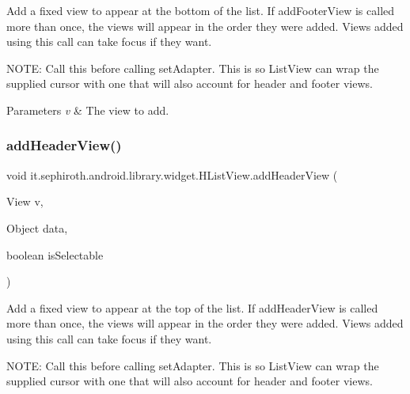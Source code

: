 Add a fixed view to appear at the bottom of the list. If add\+Footer\+View is called more than once, the views will appear in the order they were added. Views added using this call can take focus if they want. 

N\+O\+TE\+: Call this before calling set\+Adapter. This is so List\+View can wrap the supplied cursor with one that will also account for header and footer views.


\begin{DoxyParams}{Parameters}
{\em v} & The view to add. \\
\hline
\end{DoxyParams}
\mbox{\label{classit_1_1sephiroth_1_1android_1_1library_1_1widget_1_1_h_list_view_aecc0066eda50ae16e9a48114dc71eb3e}} 
\subsubsection{\texorpdfstring{add\+Header\+View()}{addHeaderView()}\hspace{0.1cm}{\footnotesize\ttfamily [1/2]}}
{\footnotesize\ttfamily void it.\+sephiroth.\+android.\+library.\+widget.\+H\+List\+View.\+add\+Header\+View (\begin{DoxyParamCaption}\item[{View}]{v,  }\item[{Object}]{data,  }\item[{boolean}]{is\+Selectable }\end{DoxyParamCaption})}

Add a fixed view to appear at the top of the list. If add\+Header\+View is called more than once, the views will appear in the order they were added. Views added using this call can take focus if they want. 

N\+O\+TE\+: Call this before calling set\+Adapter. This is so List\+View can wrap the supplied cursor with one that will also account for header and footer views.


